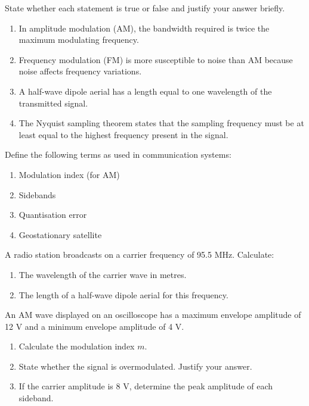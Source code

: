 \documentclass[11pt]{article}
\newcounter{popsec}
\newcounter{popsub}
\newcommand{\courssub}[1]{%
  \stepcounter{popsub}%
  \par\vspace{9pt}\noindent{\popxbold\fontsize{11.5}{13}\selectfont\color{popink}{\color{poporange}\thepopsec.\thepopsub}\hspace{6pt}#1}\par\nopagebreak\vspace{4pt}
}
\begin{document}
\begin{exercice}
State whether each statement is true or false and justify your answer briefly.
\begin{enumerate}
\item In amplitude modulation (AM), the bandwidth required is twice the maximum modulating frequency.
\item Frequency modulation (FM) is more susceptible to noise than AM because noise affects frequency variations.
\item A half-wave dipole aerial has a length equal to one wavelength of the transmitted signal.
\item The Nyquist sampling theorem states that the sampling frequency must be at least equal to the highest frequency present in the signal.
\end{enumerate}
\end{exercice}

\begin{exercice}[Definitions]
Define the following terms as used in communication systems:
\begin{enumerate}
\item Modulation index (for AM)
\item Sidebands
\item Quantisation error
\item Geostationary satellite
\end{enumerate}
\end{exercice}

\begin{exercice}
A radio station broadcasts on a carrier frequency of 95.5 MHz. Calculate:
\begin{enumerate}
\item The wavelength of the carrier wave in metres.
\item The length of a half-wave dipole aerial for this frequency.
\end{enumerate}
\end{exercice}

\courssub{I practise}

\begin{exercice}
An AM wave displayed on an oscilloscope has a maximum envelope amplitude of 12 V and a minimum envelope amplitude of 4 V.
\begin{enumerate}
\item Calculate the modulation index $m$.
\item State whether the signal is overmodulated. Justify your answer.
\item If the carrier amplitude is 8 V, determine the peak amplitude of each sideband.
\end{enumerate}
\end{exercice}
\end{document}
